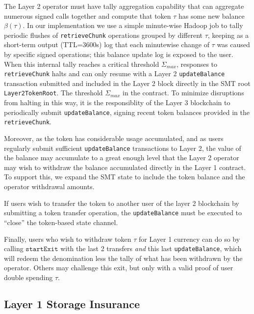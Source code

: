 \documentclass{article}
\newcommand{\startexit}{\texttt{startExit}}
\newcommand{\balance}{\beta}
\begin{document}
The Layer 2 operator must have tally aggregation capability that can aggregate numerous signed calls together and compute that token $\tau$ has some new balance $\balance(\tau)$.  In our implementation we use a simple minute-wise Hadoop job to tally periodic flushes of \texttt{retrieveChunk} operations grouped by different $\tau$, keeping as a short-term output (TTL=3600s) log that each minutewise change of $\tau$ was caused by specific signed operations; this balance update log is exposed to the user.  When this internal tally reaches a critical threshold $\Sigma_{max}$, responses to \texttt{retrieveChunk} halts and can only resume with a Layer 2 \texttt{updateBalance} transaction submitted and included in the Layer 2 block directly in the SMT root \texttt{Layer2TokenRoot}.   The threshold $\Sigma_{max}$ in the contract.  To minimize disruptions from halting in this way, it is the responsiblity of the Layer 3 blockchain to periodically submit \texttt{updateBalance}, signing recent token balances provided in the  \texttt{retrieveChunk}.

Moreover, as the token has considerable usage accumulated, and as users regularly submit sufficient \texttt{updateBalance} transactions to Layer 2, the value of the balance may accumulate to a great enough level that the Layer 2 operator may wish to withdraw the balance accumulated directly in the Layer 1 contract.   To support this, we expand the SMT state to include the token balance and the operator withdrawal amounts.  

If users wish to transfer the token to another user of the layer 2 blockchain by submitting a token transfer operation, the \texttt{updateBalance} must be executed to ``close'' the token-based state channel. 

Finally, users who wish to withdraw token $\tau$ for Layer 1 currency can do so by calling $\startexit$ with the last 2 transfers {\em and} this last \texttt{updateBalance}, which will redeem the denomination less the tally of what has been withdrawn by the operator.  Others may challenge this exit, but only with a valid proof of user double spending $\tau$.

\subsection{Layer 1 Storage Insurance}
\end{document}

